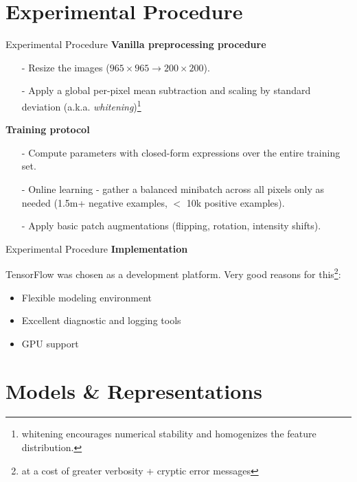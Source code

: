 \documentclass[10pt]{beamer}
\begin{document}
\section{Experimental Procedure}
\begin{frame}{Experimental Procedure}
\textbf{Vanilla preprocessing procedure}
  \begin{itemize}
  	\item[-] Resize the images ($965 \times 965 \rightarrow 200 \times 200$).
  	\item[-] Apply a global per-pixel mean subtraction and scaling by standard deviation (a.k.a. \emph{whitening})\footnote{whitening encourages numerical stability and homogenizes the feature distribution.}
\end{itemize}

\textbf{Training protocol}
\begin{itemize}
  	\item[-] Compute parameters with closed-form expressions over the entire training set.
  	\item[-] Online learning - gather a balanced minibatch across all pixels only as needed (1.5m+ negative examples, $<$ 10k positive examples).
  	\item[-] Apply basic patch augmentations (flipping, rotation, intensity shifts).
  \end{itemize}
\end{frame}

\begin{frame}[fragile]{Experimental Procedure}
\textbf{Implementation}

TensorFlow was chosen as a development platform. Very good reasons for this\footnote{at a cost of greater verbosity + cryptic error messages}:
\begin{itemize}
	\item Flexible modeling environment
	\item Excellent diagnostic and logging tools
	\item GPU support
\end{itemize}
\end{frame}


\section{Models \& Representations}
\end{document}
